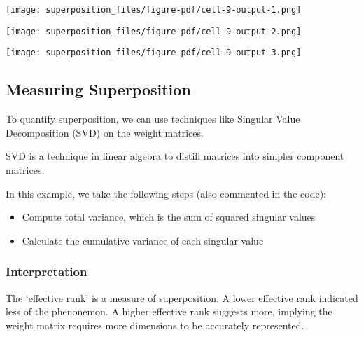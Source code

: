 \documentclass[
  letterpaper,
  DIV=11,
  numbers=noendperiod]{scrreprt}
\providecommand{\tightlist}{%
  \setlength{\itemsep}{0pt}\setlength{\parskip}{0pt}}\usepackage{longtable,booktabs,array}
\begin{document}
\texttt{[image: superposition\_files/figure-pdf/cell-9-output-1.png]}

\texttt{[image: superposition\_files/figure-pdf/cell-9-output-2.png]}

\texttt{[image: superposition\_files/figure-pdf/cell-9-output-3.png]}

\subsection{Measuring Superposition}\label{measuring-superposition}

To quantify superposition, we can use techniques like Singular Value
Decomposition (SVD) on the weight matrices.

SVD is a technique in linear algebra to distill matrices into simpler
component matrices.

In this example, we take the following steps (also commented in the
code):

\begin{itemize}
\tightlist
\item
  Compute total variance, which is the sum of squared singular values
\item
  Calculate the cumulative variance of each singular value
\end{itemize}

\subsubsection{Interpretation}\label{interpretation}

The `effective rank' is a measure of superposition. A lower effective
rank indicated less of the phenonemon. A higher effective rank suggests
more, implying the weight matrix requires more dimensions to be
accurately represented.
\end{document}
